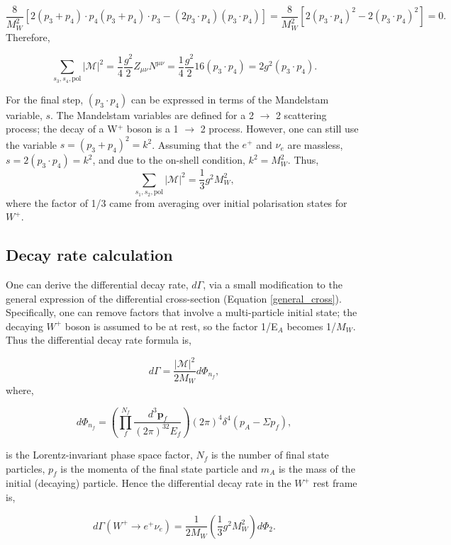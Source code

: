 \documentclass[a4paper,11pt]{article}
\begin{document}
$$\frac{8}{M_W^2}[2(p_3 + p_4) \cdot p_4 (p_3 +p_4 )\cdot p_3 - (2p_3\cdot p_4)(p_3 \cdot p_4)]  = \frac{8}{M_W^2}[2(p_3 \cdot p_4)^2 - 2(p_3 \cdot p_4)^2] = 0.$$	
Therefore,

$$ \sum_{s_3, s_4, \text{pol}}|\mathcal{M}|^2=  \frac{1}{4} \frac{g^2}{2} Z_{\mu\nu}N^{\mu\nu} = \frac{1}{4} \frac{g^2}{2}  16(p_3 \cdot p_4) = 2g^2(p_3 \cdot p_4).$$

For the final step, $(p_3 \cdot p_4)$ can be expressed in terms of the Mandelstam variable, $s$. The Mandelstam variables are defined for a 2 $\rightarrow$ 2 scattering process; the decay of a W$^+$ boson is a 1 $\rightarrow$ 2 process. However, one can still use the variable $s = (p_3 + p_4)^2 = k^2$. Assuming that the $e^+$ and $\nu_e$ are massless, $s = 2(p_3 \cdot p_4) =k^2$, and due to the on-shell condition, $k^2 = M_W^2$. Thus, 
\begin{equation}
	 \sum_{s_1, s_2, \text{pol}}|\mathcal{M}|^2 = \frac{1}{3}g^2 M_W^2,	
\end{equation}
where the factor of 1/3 came from averaging over initial polarisation states for $W^+.$




\subsection{Decay rate calculation}
One can derive the differential decay rate, $d \Gamma$, via a small modification to the general expression of the differential cross-section (Equation  \ref{general_cross}). Specifically, one can remove factors that involve a multi-particle initial state; the decaying $W^+$ boson is assumed to be at rest, so the factor 1/E$_A$ becomes 1/$M_W$. Thus the differential decay rate formula is,

\begin{equation}\label{decay-formula}
	d\Gamma= \frac{|\mathcal{M}|^2 }{2M_W} d\Phi_{n_f},
\end{equation}
where,

$$ d\Phi_{n_f}=	 \left(\prod_{f}^{N_f}\frac{d^3\boldsymbol{p}_f}{(2\pi)^32E_f}\right) (2\pi)^4 \delta^4 (p_A - \Sigma p_f),$$

is the Lorentz-invariant phase space factor, $N_f$ is the number of final state particles, $p_f$ is the momenta of the final state particle and $m_A$ is the mass of the initial (decaying) particle. Hence the differential decay rate in the $W^+$ rest frame is,

\begin{equation}
	d\Gamma (W^+ \rightarrow e^+ \nu_e) =  \frac{1}{2M_W} \left(\frac{1}{3}g^2 M_W^2\right) d\Phi_{2}.
\end{equation}
\end{document}
